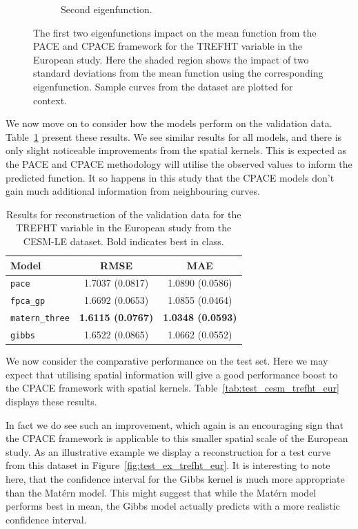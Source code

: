 \begin{figure}
\begin{subfigure}[b]{0.45\textwidth}
		\caption{Second eigenfunction.}
		\label{fig:phi_2_trefht_eur}
	\end{subfigure}
	\caption{The first two eigenfunctions impact on the mean function from the PACE and CPACE framework for the TREFHT variable in the European study. Here the shaded region shows the impact of two standard deviations from the mean function using the corresponding eigenfunction. Sample curves from the dataset are plotted for context.}
	\label{fig:phi_trefht_eur}
\end{figure}

We now move on to consider how the models perform on the validation data.
Table~\ref{tab:train_cesm_trefht_eur} present these results.
We see similar results for all models, and there is only slight noticeable improvements from the spatial kernels.
This is expected as the PACE and CPACE methodology will utilise the observed values to inform the predicted function.
It so happens in this study that the CPACE models don't gain much additional information from neighbouring curves. 

\begin{table}
	\caption[Results for TREFHT variable on validation data in the European study]{Results for reconstruction of the validation data for the TREFHT variable in the European study from the CESM-LE dataset. Bold indicates best in class.}
	\centering
	\label{tab:train_cesm_trefht_eur}
	\begin{tabular}{lcc}
		\toprule
		\textbf{Model} & \textbf{RMSE} & \textbf{MAE} \\
		\midrule
		\verb*|pace| & 1.7037 (0.0817) & 1.0890	(0.0586) \\
		\verb*|fpca_gp| & 1.6692 (0.0653) & 1.0855	(0.0464) \\
		\verb*|matern_three| & \textbf{1.6115 (0.0767)} & \textbf{1.0348	(0.0593)}\\
		\verb*|gibbs| & 1.6522	(0.0865) & 1.0662 (0.0552)\\
		\bottomrule
	\end{tabular}
\end{table}

We now consider the comparative performance on the test set.
Here we may expect that utilising spatial information will give a good performance boost to the CPACE framework with spatial kernels.
Table~\ref{tab:test_cesm_trefht_eur} displays these results.

In fact we do see such an improvement, which again is an encouraging sign that the CPACE framework is applicable to this smaller spatial scale of the European study.
As an illustrative example we display a reconstruction for a test curve from this dataset in Figure~\ref{fig:test_ex_trefht_eur}.
It is interesting to note here, that the confidence interval for the Gibbs kernel is much more appropriate than the Mat\'ern model. 
This might suggest that while the Mat\'ern model performs best in mean, the Gibbs model actually predicts with a more realistic confidence interval. 


